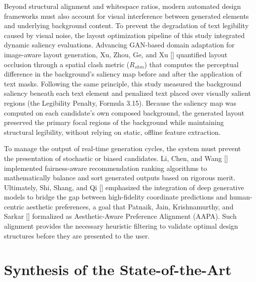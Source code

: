 \begin{refsection}
Beyond structural alignment and whitespace ratios, modern automated design frameworks must also account for visual interference between generated elements and underlying background content. To prevent the degradation of text legibility caused by visual noise, the layout optimization pipeline of this study integrated dynamic saliency evaluations. Advancing GAN-based domain adaptation for image-aware layout generation, Xu, Zhou, Ge, and Xu [\citeyear{Xuetal2026}] quantified layout occlusion through a spatial clash metric ($R_{shm}$) that computes the perceptual difference in the background's saliency map before and after the application of text masks. Following the same principle, this study measured the background saliency beneath each text element and penalized text placed over visually salient regions (the Legibility Penalty, Formula 3.15). Because the saliency map was computed on each candidate's own composed background, the generated layout preserved the primary focal regions of the background while maintaining structural legibility, without relying on static, offline feature extraction.

To manage the output of real-time generation cycles, the system must prevent the presentation of stochastic or biased candidates. Li, Chen, and Wang [\citeyear{Li2023Fairness}] implemented fairness-aware recommendation ranking algorithms to mathematically balance and sort generated outputs based on rigorous merit. Ultimately, Shi, Shang, and Qi [\citeyear{Shi2023Survey}] emphasized the integration of deep generative models to bridge the gap between high-fidelity coordinate predictions and human-centric aesthetic preferences, a goal that Patnaik, Jain, Krishnamurthy, and Sarkar [\citeyear{Patnaik2025AesthetiQ}] formalized as Aesthetic-Aware Preference Alignment (AAPA). Such alignment provides the necessary heuristic filtering to validate optimal design structures before they are presented to the user.

\section{Synthesis of the State-of-the-Art}


\end{refsection}
